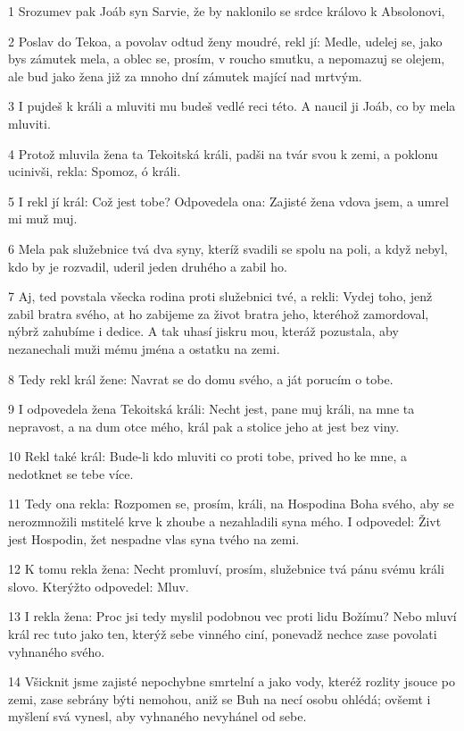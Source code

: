\par 1 Srozumev pak Joáb syn Sarvie, že by naklonilo se srdce královo k Absolonovi,
\par 2 Poslav do Tekoa, a povolav odtud ženy moudré, rekl jí: Medle, udelej se, jako bys zámutek mela, a oblec se, prosím, v roucho smutku, a nepomazuj se olejem, ale bud jako žena již za mnoho dní zámutek mající nad mrtvým.
\par 3 I pujdeš k králi a mluviti mu budeš vedlé reci této. A naucil ji Joáb, co by mela mluviti.
\par 4 Protož mluvila žena ta Tekoitská králi, padši na tvár svou k zemi, a poklonu ucinivši, rekla: Spomoz, ó králi.
\par 5 I rekl jí král: Což jest tobe? Odpovedela ona: Zajisté žena vdova jsem, a umrel mi muž muj.
\par 6 Mela pak služebnice tvá dva syny, kteríž svadili se spolu na poli, a když nebyl, kdo by je rozvadil, uderil jeden druhého a zabil ho.
\par 7 Aj, ted povstala všecka rodina proti služebnici tvé, a rekli: Vydej toho, jenž zabil bratra svého, at ho zabijeme za život bratra jeho, kteréhož zamordoval, nýbrž zahubíme i dedice. A tak uhasí jiskru mou, kteráž pozustala, aby nezanechali muži mému jména a ostatku na zemi.
\par 8 Tedy rekl král žene: Navrat se do domu svého, a ját porucím o tobe.
\par 9 I odpovedela žena Tekoitská králi: Necht jest, pane muj králi, na mne ta nepravost, a na dum otce mého, král pak a stolice jeho at jest bez viny.
\par 10 Rekl také král: Bude-li kdo mluviti co proti tobe, prived ho ke mne, a nedotknet se tebe více.
\par 11 Tedy ona rekla: Rozpomen se, prosím, králi, na Hospodina Boha svého, aby se nerozmnožili mstitelé krve k zhoube a nezahladili syna mého. I odpovedel: Živt jest Hospodin, žet nespadne vlas syna tvého na zemi.
\par 12 K tomu rekla žena: Necht promluví, prosím, služebnice tvá pánu svému králi slovo. Kterýžto odpovedel: Mluv.
\par 13 I rekla žena: Proc jsi tedy myslil podobnou vec proti lidu Božímu? Nebo mluví král rec tuto jako ten, kterýž sebe vinného ciní, ponevadž nechce zase povolati vyhnaného svého.
\par 14 Všicknit jsme zajisté nepochybne smrtelní a jako vody, kteréž rozlity jsouce po zemi, zase sebrány býti nemohou, aniž se Buh na necí osobu ohlédá; ovšemt i myšlení svá vynesl, aby vyhnaného nevyhánel od sebe.
